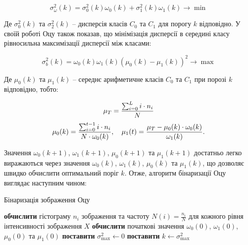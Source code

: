 $$\sigma_{\omega}^{2}(k) = \sigma_{0}^2(k) \omega_0(k) + \sigma_{1}^2(k) \omega_1(k) \rightarrow \min$$

Де $\sigma_{0}^2(k)$ та $\sigma_{2}^2(k)$ -- дисперсія класів $C_0$ та $C_1$ для порогу $k$ відповідно. У своїй роботі Оцу також показав, що мінімізація дисперсії в середині класу рівносильна максимізації дисперсії між класами:

$$\sigma_{b}^2(k) = \omega_0(k)\omega_1(k) \left( \mu_0(k) - \mu_1(k) \right)^2 \rightarrow \max$$

Де $\mu_0(k)$ та $\mu_1(k)$ -- середнє арифметичне класів $C_0$ та $C_1$ при порозі $k$ відповідно, тобто:

$$\mu_T = {{\sum^{L}_{i=0} {i \cdot n_i}} \over {N}} $$
$$\mu_0(k) = {{\sum^{t-1}_{i=0} {i \cdot n_i}} \over {N \cdot \omega_0(k)}}, \quad \mu_1(t) = {{\mu_T - \mu_0(k) \cdot \omega_0(k)} \over {\omega_1(k)}}.$$

Значення $\omega_0(k+1)$, $\omega_1(k+1)$, $\mu_0(k+1)$ та $\mu_1(k+1)$ достатньо легко виражаються через значення $\omega_0(k)$, $\omega_1(k)$, $\mu_0(k)$ та $\mu_1(k)$, що дозволяє швидко обчислити оптимальний поріг $k$. Отже, алгоритм бінаризації Оцу виглядає наступним чином:

\begin{megaalgorithm}[H]
	\caption{Бінаризація зображення Оцу}
	
	\BlankLine 
	
	\textbf{обчислити} гістограму $n_i$ зображення та частоту $N(i) = \frac{n_i}{N}$ для кожного рівня інтенсивності зображення $X$\;
	\textbf{обчислити} початкові значення $\omega_0(0)$, $\omega_1(0)$, $\mu_0(0)$ та $\mu_1(0)$\;
	\textbf{поставити} $\sigma_{\max}^2 \leftarrow 0$\;
	\textbf{поставити} $k \leftarrow \sigma_{\max}^2$\;
\end{megaalgorithm}

